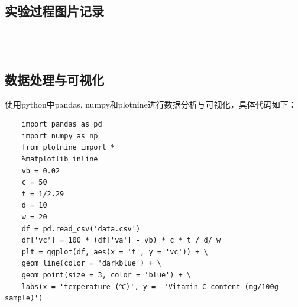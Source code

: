 \documentclass[12pt,hyperref,a4paper,UTF8]{ctexart}
\begin{document}
\subsection{实验过程图片记录}
\begin{figure}[h]
	\centering
	\\    %
	\\ 
\end{figure}
\newpage
\subsection{数据处理与可视化}
使用python中pandas, numpy和plotnine进行数据分析与可视化，具体代码如下：
\begin{verbatim}
	import pandas as pd
	import numpy as np
	from plotnine import *
	%matplotlib inline
	vb = 0.02
	c = 50
	t = 1/2.29
	d = 10
	w = 20
	df = pd.read_csv('data.csv')
	df['vc'] = 100 * (df['va'] - vb) * c * t / d/ w
	plt = ggplot(df, aes(x = 't', y = 'vc')) + \
	geom_line(color = 'darkblue') + \
	geom_point(size = 3, color = 'blue') + \
	labs(x = 'temperature (℃)', y =  'Vitamin C content (mg/100g sample)')
\end{verbatim}
\reference
\end{document}
